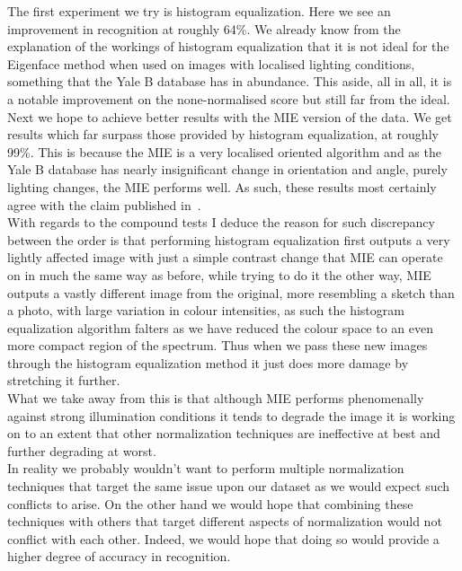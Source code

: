 The first experiment we try is histogram equalization.  Here we see an improvement in recognition at roughly 64\%.  We 
already know from the explanation of the workings of histogram equalization that it is not ideal for the Eigenface
method when used on images with localised lighting conditions, something that the Yale B database has in abundance.  
This aside, all in all, it is a notable improvement on the none-normalised score but still far from the ideal. \\

Next we hope to achieve better results with the MIE version of the data.  We get results which far surpass those provided 
by histogram equalization, at roughly 99\%. This is because the MIE is a very localised oriented algorithm and as the Yale B 
database has nearly insignificant change in orientation and angle, purely lighting changes, the MIE performs well.  
As such, these results most certainly agree with the claim published in~\cite{LuoaRINMBoMEfFR}. \\

With regards to the compound tests I deduce the reason for such discrepancy between the order is that performing histogram 
equalization first outputs a very lightly affected image with just a simple contrast change that MIE can operate on in much 
the same way as before, while trying to do it the other way, MIE outputs a vastly different image from the original, more 
resembling a sketch than a photo, with large variation in colour intensities,  as such the histogram equalization algorithm 
falters as we have reduced the colour space to an even more compact region of the spectrum.  Thus when we pass these new 
images through the histogram equalization method it just does more damage by stretching it further.  \\

What we take away from this is that although MIE performs phenomenally against strong illumination conditions it tends to 
degrade the image it is working on to an extent that other normalization techniques are ineffective at best and further 
degrading at worst. \\

In reality we probably wouldn't want to perform multiple normalization techniques that target the same issue upon our dataset 
as we would expect such conflicts to arise.  On the other hand we would hope that combining these techniques with others that 
target different aspects of normalization would not conflict with each other.  Indeed, we would hope that doing so would provide
a higher degree of accuracy in recognition.


